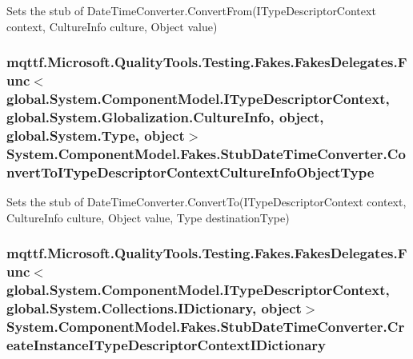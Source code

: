Sets the stub of Date\-Time\-Converter.\-Convert\-From(\-I\-Type\-Descriptor\-Context context, Culture\-Info culture, Object value)

\hypertarget{class_system_1_1_component_model_1_1_fakes_1_1_stub_date_time_converter_a937aa8a7ee9f62cd32cdd3403766e67e}{
\subsubsection[{Convert\-To\-I\-Type\-Descriptor\-Context\-Culture\-Info\-Object\-Type}]{\setlength{\rightskip}{0pt plus 5cm}mqttf.\-Microsoft.\-Quality\-Tools.\-Testing.\-Fakes.\-Fakes\-Delegates.\-Func$<$global.\-System.\-Component\-Model.\-I\-Type\-Descriptor\-Context, global.\-System.\-Globalization.\-Culture\-Info, object, global.\-System.\-Type, object$>$ System.\-Component\-Model.\-Fakes.\-Stub\-Date\-Time\-Converter.\-Convert\-To\-I\-Type\-Descriptor\-Context\-Culture\-Info\-Object\-Type}}\label{class_system_1_1_component_model_1_1_fakes_1_1_stub_date_time_converter_a937aa8a7ee9f62cd32cdd3403766e67e}


Sets the stub of Date\-Time\-Converter.\-Convert\-To(\-I\-Type\-Descriptor\-Context context, Culture\-Info culture, Object value, Type destination\-Type)

\hypertarget{class_system_1_1_component_model_1_1_fakes_1_1_stub_date_time_converter_aa9df84235bd62164c15cdaead8dda56f}{
\subsubsection[{Create\-Instance\-I\-Type\-Descriptor\-Context\-I\-Dictionary}]{\setlength{\rightskip}{0pt plus 5cm}mqttf.\-Microsoft.\-Quality\-Tools.\-Testing.\-Fakes.\-Fakes\-Delegates.\-Func$<$global.\-System.\-Component\-Model.\-I\-Type\-Descriptor\-Context, global.\-System.\-Collections.\-I\-Dictionary, object$>$ System.\-Component\-Model.\-Fakes.\-Stub\-Date\-Time\-Converter.\-Create\-Instance\-I\-Type\-Descriptor\-Context\-I\-Dictionary}}\label{class_system_1_1_component_model_1_1_fakes_1_1_stub_date_time_converter_aa9df84235bd62164c15cdaead8dda56f}


